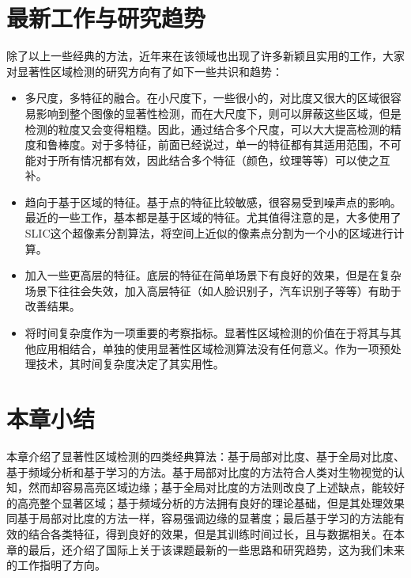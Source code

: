 \section{最新工作与研究趋势}
除了以上一些经典的方法，近年来在该领域也出现了许多新颖且实用的工作\cite{borji2012salient}\cite{yan2013hierarchical}\cite{shi2013pisa}\cite{wei2012geodesic}，大家对显著性区域检测的研究方向有了如下一些共识和趋势：
\begin{itemize}
\item 多尺度，多特征的融合。在小尺度下，一些很小的，对比度又很大的区域很容易影响到整个图像的显著性检测，而在大尺度下，则可以屏蔽这些区域，但是检测的粒度又会变得粗糙。因此，通过结合多个尺度，可以大大提高检测的精度和鲁棒度。对于多特征，前面已经说过，单一的特征都有其适用范围，不可能对于所有情况都有效，因此结合多个特征（颜色，纹理等等）可以使之互补。
\item 趋向于基于区域的特征。基于点的特征比较敏感，很容易受到噪声点的影响。最近的一些工作，基本都是基于区域的特征。尤其值得注意的是，大多使用了SLIC\cite{achanta2010slic}这个超像素分割算法，将空间上近似的像素点分割为一个小的区域进行计算。
\item 加入一些更高层的特征。底层的特征在简单场景下有良好的效果，但是在复杂场景下往往会失效，加入高层特征（如人脸识别子，汽车识别子等等）有助于改善结果。
\item 将时间复杂度作为一项重要的考察指标。显著性区域检测的价值在于将其与其他应用相结合，单独的使用显著性区域检测算法没有任何意义。作为一项预处理技术，其时间复杂度决定了其实用性。
\end{itemize}

\section{本章小结}
本章介绍了显著性区域检测的四类经典算法：基于局部对比度、基于全局对比度、基于频域分析和基于学习的方法。基于局部对比度的方法符合人类对生物视觉的认知，然而却容易高亮区域边缘；基于全局对比度的方法则改良了上述缺点，能较好的高亮整个显著区域；基于频域分析的方法拥有良好的理论基础，但是其处理效果同基于局部对比度的方法一样，容易强调边缘的显著度；最后基于学习的方法能有效的结合各类特征，得到良好的效果，但是其训练时间过长，且与数据相关。在本章的最后，还介绍了国际上关于该课题最新的一些思路和研究趋势，这为我们未来的工作指明了方向。
